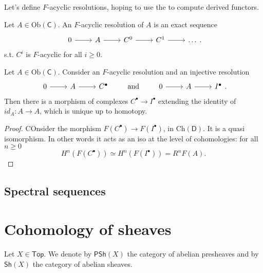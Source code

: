 \documentclass[../Main]{subfiles}
\begin{document}
Let's define $F$-acyclic resolutions, hoping to use the to compute
derived functors.

\begin{defn}
	Let $A \in \mathrm{Ob} \left(\mathsf{C}\right)$.
	An $F$-acyclic resolution of $A$ is an exact sequence
	\begin{equation}
	\begin{tikzcd}
		0 \arrow[r, "", rightarrow] &
		A \arrow[r, "", rightarrow] &
		C^0 \arrow[r, "", rightarrow] &
		C^1 \arrow[r, "", rightarrow] &
		\ldots
	\end{tikzcd}
	.\end{equation} 
	s.t. $C^i$ is $F$-acyclic for all $i \geq 0$.
\end{defn}

\begin{prop}[]
	Let $A \in \mathrm{Ob} \left(\mathsf{C}\right)$.
	Consider an $F$-acyclic resolution and an injective resolution
	\begin{equation}
	\begin{tikzcd}
		0 \arrow[r, "", rightarrow] &
		A \arrow[r, "", rightarrow] &
		C^\bullet
	\end{tikzcd}
	\qquad \text{ and } \qquad
	\begin{tikzcd}
		0 \arrow[r, "", rightarrow] &
		A \arrow[r, "", rightarrow] &
		I^\bullet
	\end{tikzcd}
	.\end{equation} 
	Then there is a morphism of complexes $C^\bullet \to  I^\bullet$
	extending the identity of $id_A\colon A \to A$,
	which is unique up to homotopy.
\end{prop}
\begin{proof}
	COnsider the morphism $F(C^\bullet) \to  F(I^\bullet)$, in $\mathrm{Ch}(\mathsf{D})$.
	It is a quasi isomorphism. 
	In other words it acts as an iso at the level of cohomologies:
	for all $n \geq 0$
	\begin{equation}
		H^{n} \left( F(C^\bullet) \right) \simeq
		H^{n} \left( F(I^\bullet) \right) = R^{n}F \left( A \right)
	.\end{equation} 
\end{proof}

\subsection{Spectral sequences}

\section{Cohomology of sheaves}
Let $X \in \mathsf{Top}$.
We denote by $\mathsf{PSh}\left( X \right)$ the category of abelian presheaves and
by $\mathsf{Sh}\left( X \right)$ the category of abelian sheaves.
\end{document}
